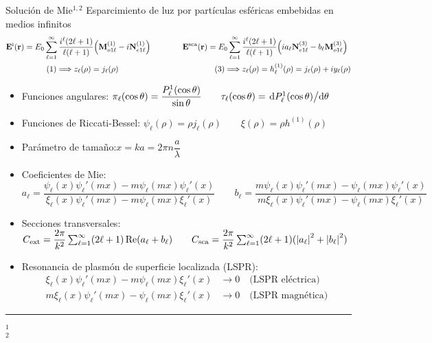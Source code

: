 
\begin{frame}{Solución de Mie$^{1,2}$}
	{Esparcimiento de luz por partículas esféricas embebidas en medios infinitos \hyperlink{fr:Apoyo}{\beamerreturnbutton{}}}
	\small
	\begin{align*}
	\vb{E}^\text{i} (\vb{r})= E_0 \sum_{\ell = 1}^\infty\dfrac{i^\ell(2\ell+1)}{\ell(\ell+1)}\qty( \vb{M}_{o1\ell}^{(1)} -i \vb{N}_{e1\ell}^{(1)})
	\qquad & \qquad
	\vb{E}^\text{sca} (\vb{r}) = E_0 \sum_{\ell = 1}^\infty\dfrac{i^\ell(2\ell+1)}{\ell(\ell+1)}\qty(i a_\ell \vb{N}_{e1\ell}^{(3)} -b_\ell \vb{M}_{o1\ell}^{(3)})\\
	(1) \Longrightarrow z_\ell(\rho) = j_\ell(\rho)    \qquad\qquad \qquad & \qquad\qquad \qquad(3) \Longrightarrow z_\ell(\rho)  = h^{(1)}_\ell(\rho)  =  j_\ell(\rho)  + i y_\ell(\rho)
	\end{align*}

	\begin{itemize}
		\item Funciones angulares:\; $ \pi_\ell(\cos\theta )  = \dfrac{P_\ell^1(\cos\theta)}{\sin\theta} \qquad  \tau_\ell(\cos\theta) = \dv*{P_\ell^1(\cos\theta)}{\theta} $
		\item Funciones de Riccati-Bessel:\; $\psi_\ell(\rho) = \rho j_\ell(\rho)\qquad \xi(\rho) = \rho h^{(1)}(\rho)$
		\item Parámetro de tamaño:\;$x = k a = 2\pi n \dfrac{a}{\lambda}$
		\item Coeficientes de Mie:\; $
			a_\ell = \dfrac{\psi_\ell(x)\psi_\ell' (mx)-m\psi_\ell(mx)\psi_\ell'(x)}
				{\xi_\ell(x)\psi_\ell'(mx)-m\psi_\ell(mx)\xi_\ell'(x)}
				\qquad
	b_\ell = \dfrac{m\psi_\ell(x)\psi_\ell' (mx)-\psi_\ell(mx)\psi_\ell'(x)}
			{m\xi_\ell(x)\psi_\ell'(mx)-\psi_\ell(mx)\xi_\ell'(x)}
		$
		\item Secciones transversales: \; $C_\text{ext} = \dfrac{2 \pi}{k^2}\sum_{\ell = 1}^\infty (2 \ell + 1) \Re(a_\ell + b_\ell)
										\qquad
										C_\text{sca} = \dfrac{2 \pi}{k^2}\sum_{\ell = 1}^\infty (2 \ell + 1) (\abs{a_\ell}^2 + \abs{b_\ell}^2)$
		\item Resonancia de plasmón de superficie localizada (LSPR): %
			\begin{align*}
			\xi_\ell(x)\psi_\ell'(mx)-m\psi_\ell(mx)\xi_\ell'(x) &\to 0 \quad \text{(LSPR eléctrica)}\\
 	m\xi_\ell(x)\psi_\ell'(mx)-\psi_\ell(mx)\xi_\ell'(x) &\to 0 \quad \text{(LSPR magnética)}
			\end{align*}
	\end{itemize}


	\vspace*{0em}
	\noindent\rule{.25\textwidth}{0.4pt}
 \begin{spacing}{0}\fontsize{4}{5} \selectfont
	$^1$ \\
	$^2$ 
	\end{spacing}
\end{frame}
